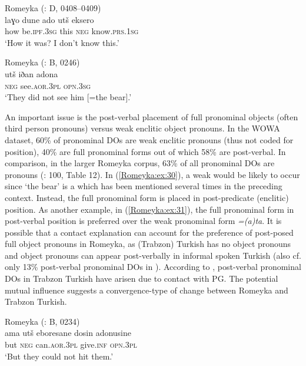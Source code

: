 \documentclass[output=paper,colorlinks,citecolor=brown]{langscibook}
\begin{document}
\ea\label{Romeyka:ex:29}
Romeyka (\citealt{schreiber2021pontic}: D, 0408--0409) \\
\gll laɣo dune ado utš eksero \\
how be\textsc{.ipf.3sg} this \textsc{neg} know\textsc{.prs.1sg} \\
\glt 	`How it was? I don't know this.'  \\
\z

\ea\label{Romeyka:ex:30}
Romeyka (\citealt{schreiber2021pontic}: B, 0246) \\
\gll utš iðan adona \\
\textsc{neg} see\textsc{.aor.3pl} \textsc{opn.3sg} \\
\glt `They did not see him [=the bear].'  \\
\z

An important issue is the post-verbal placement of full pronominal objects (often third person pronouns) versus weak enclitic object pronouns. In the WOWA dataset, 60\% of pronominal DOs are weak enclitic pronouns (thus not coded for position), 40\% are full pronominal forms out of which 58\% are post-verbal. In comparison, in the larger Romeyka corpus, 63\% of all pronominal DOs are  pronouns (\citealt{schreibergrammar2022}: 100, Table 12). In (\ref{Romeyka:ex:30}), a weak   would be likely to occur since `the bear' is a  which has been mentioned several times in the preceding context. Instead, the full pronominal form is placed in post-predicate (enclitic) position. As another example, in (\ref{Romeyka:ex:31}), the full pronominal form in post-verbal position is preferred over the weak pronominal form \textit{=(a)ta}. It is possible that a contact explanation can account for the preference of post-posed full object pronouns in Romeyka, as (Trabzon) Turkish has no  object pronouns and object pronouns can appear post-verbally in informal spoken Turkish (also cf. only 13\% post-verbal pronominal DOs in \citealt{hodgson_pontic_nodate}). According to \citet[30]{brendemoen2005}, post-verbal pronominal DOs in Trabzon Turkish have arisen due to contact with PG. The potential mutual influence suggests a convergence-type of change between Romeyka and Trabzon Turkish.

\ea\label{Romeyka:ex:31}
Romeyka (\citealt{schreiber2021pontic}: B, 0234) \\
\gll ama utš eboresane dosin adonusine \\
but \textsc{neg} can\textsc{.aor.3pl} give\textsc{.inf} \textsc{opn.3pl} \\
\glt `But they could not hit them.'  \\
\z
\end{document}
